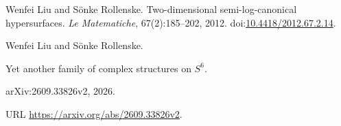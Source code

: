 Wenfei Liu and S{\"o}nke Rollenske.
\newblock Two-dimensional semi-log-canonical hypersurfaces.
\newblock \emph{Le Matematiche}, 67(2):185--202, 2012.
\newblock doi:\href{https://doi.org/10.4418/2012.67.2.14}{10.4418/2012.67.2.14}.

Wenfei Liu and S{\"o}nke Rollenske.

\newblock Yet another family of complex structures on {$S^6$}.

\newblock arXiv:2609.33826v2, 2026.

\newblock URL \url{https://arxiv.org/abs/2609.33826v2}.

